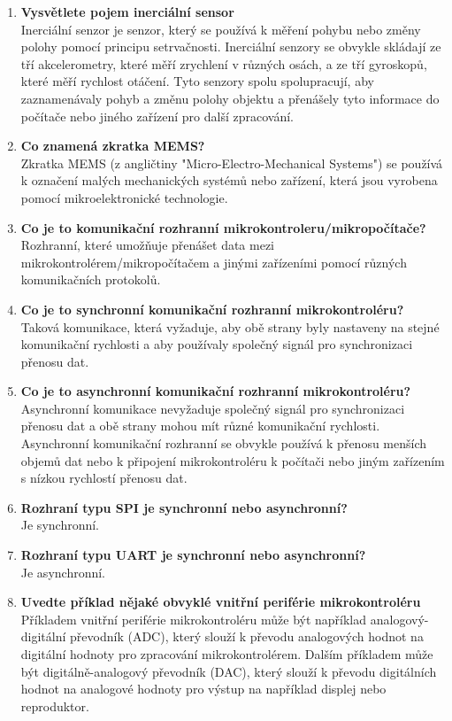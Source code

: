 \documentclass{article}
\begin{document}
\begin{enumerate}
        \item \textbf{Vysvětlete pojem inerciální sensor} \\[0.6em] { Inerciální senzor je senzor, který se používá k měření pohybu nebo změny polohy pomocí principu setrvačnosti. Inerciální senzory se obvykle skládají ze tří akcelerometry, které měří zrychlení v různých osách, a ze tří gyroskopů, které měří rychlost otáčení. Tyto senzory spolu spolupracují, aby zaznamenávaly pohyb a změnu polohy objektu a přenášely tyto informace do počítače nebo jiného zařízení pro další zpracování.}
        \item \textbf{Co znamená zkratka MEMS?} \\[0.6em] { Zkratka MEMS (z angličtiny "Micro-Electro-Mechanical Systems") se používá k označení malých mechanických systémů nebo zařízení, která jsou vyrobena pomocí mikroelektronické technologie.}
        \item \textbf{Co je to komunikační rozhranní mikrokontroleru/mikropočítače?} \\[0.6em] { Rozhranní, které umožňuje přenášet data mezi mikrokontrolérem/mikropočítačem a jinými zařízeními pomocí různých komunikačních protokolů.}
        \item \textbf{Co je to synchronní komunikační rozhranní mikrokontroléru?} \\[0.6em] { Taková komunikace, která vyžaduje, aby obě strany byly nastaveny na stejné komunikační rychlosti a aby používaly společný signál pro synchronizaci přenosu dat.}
        \item \textbf{Co je to asynchronní komunikační rozhranní mikrokontroléru?} \\[0.6em] { Asynchronní komunikace nevyžaduje společný signál pro synchronizaci přenosu dat a obě strany mohou mít různé komunikační rychlosti. Asynchronní komunikační rozhranní se obvykle používá k přenosu menších objemů dat nebo k připojení mikrokontroléru k počítači nebo jiným zařízením s nízkou rychlostí přenosu dat.}
        \item \textbf{Rozhraní typu SPI je synchronní nebo asynchronní?} \\[0.6em] { Je synchronní.}
        \item \textbf{Rozhraní typu UART je synchronní nebo asynchronní?} \\[0.6em] { Je asynchronní.}
        \item \textbf{Uvedte příklad nějaké obvyklé vnitřní periférie mikrokontroléru} \\[0.6em] { Příkladem vnitřní periférie mikrokontroléru může být například analogový-digitální převodník (ADC), který slouží k převodu analogových hodnot na digitální hodnoty pro zpracování mikrokontrolérem. Dalším příkladem může být digitálně-analogový převodník (DAC), který slouží k převodu digitálních hodnot na analogové hodnoty pro výstup na například displej nebo reproduktor.}

\end{enumerate}
\end{document}
